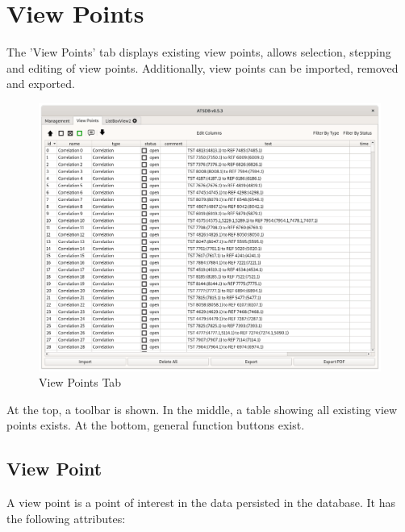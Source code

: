 \chapter{View Points}
\label{sec:view_points} 

The 'View Points' tab displays existing view points, allows selection, stepping and editing of view points. Additionally, view points can be imported, removed and exported.

\begin{figure}[H]
    \hspace*{-2.5cm}
    \includegraphics[width=19cm]{figures/view_points.png}
  \caption{View Points Tab}
\end{figure}

At the top, a toolbar is shown. In the middle, a table showing all existing view points exists. At the bottom, general function buttons exist. \\

\section{View Point}

A view point is a point of interest in the data persisted in the database. It has the following attributes:

